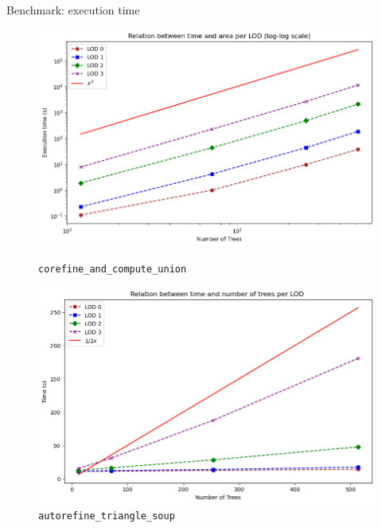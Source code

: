 \documentclass[12pt]{beamer}
\begin{document}
\begin{frame}{Benchmark: execution time}
  \begin{figure}[H]
    \centering
    \begin{minipage}{0.49\textwidth}
        \centering
        \includegraphics[width=1\textwidth]{images/bench_time_ntree_quad.png}
        \caption{\texttt{corefine\_and\_compute\_union}}
    \end{minipage}\hfill
    \begin{minipage}{0.49\textwidth}
        \centering
        \includegraphics[width=1\textwidth]{images/bench_time_ntree_linear.png}
        \caption{\texttt{autorefine\_triangle\_soup}}
    \end{minipage}
  \end{figure}
  \end{frame}


\nocite{*}


\end{document}
